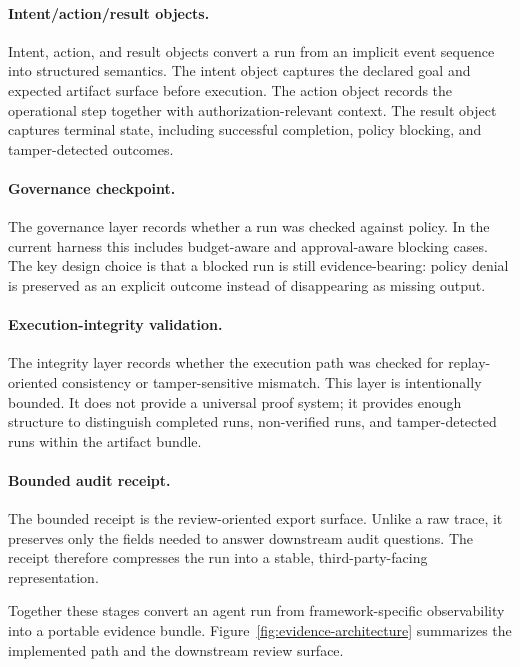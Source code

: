 \paragraph{Intent/action/result objects.}
Intent, action, and result objects convert a run from an implicit event sequence into structured semantics. The intent object captures the declared goal and expected artifact surface before execution. The action object records the operational step together with authorization-relevant context. The result object captures terminal state, including successful completion, policy blocking, and tamper-detected outcomes.

\paragraph{Governance checkpoint.}
The governance layer records whether a run was checked against policy. In the current harness this includes budget-aware and approval-aware blocking cases. The key design choice is that a blocked run is still evidence-bearing: policy denial is preserved as an explicit outcome instead of disappearing as missing output.

\paragraph{Execution-integrity validation.}
The integrity layer records whether the execution path was checked for replay-oriented consistency or tamper-sensitive mismatch. This layer is intentionally bounded. It does not provide a universal proof system; it provides enough structure to distinguish completed runs, non-verified runs, and tamper-detected runs within the artifact bundle.

\paragraph{Bounded audit receipt.}
The bounded receipt is the review-oriented export surface. Unlike a raw trace, it preserves only the fields needed to answer downstream audit questions. The receipt therefore compresses the run into a stable, third-party-facing representation.

Together these stages convert an agent run from framework-specific observability into a portable evidence bundle. Figure~\ref{fig:evidence-architecture} summarizes the implemented path and the downstream review surface.

